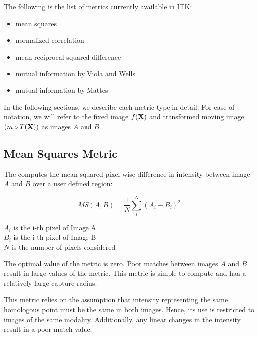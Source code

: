 The following is the list of metrics currently available in ITK:
\begin{itemize}
\item mean squares\\ 
\item normalized correlation \\ 
\item mean reciprocal squared difference \\  
\item mutual information by Viola and Wells \\ 
\item mutual information by Mattes \\ 
\end{itemize}

In the following sections, we describe each metric type in detail. 
For ease of notation, we will refer to the fixed image $f(\bf{X})$ 
and transformed moving image $(m \circ T(\bf{X}))$ as images $A$ and $B$.

\subsection{Mean Squares Metric}
\label{sec:MeanSquaresMetric}

The  computes the mean squared
pixel-wise difference in intensity between image $A$ and $B$ over a user
defined region:

\begin{equation}
MS(A,B) = \frac{1}{N} \sum_i^N \left( A_i - B_i \right)^2
\end{equation}
\begin{center}
$A_i$ is the i-th pixel of Image A\\ 
$B_i$ is the i-th pixel of Image B\\
$N$ is the number of pixels considered
\end{center}

The optimal value of the metric is zero. Poor matches between images $A$ and
$B$ result in large values of the metric. This metric is simple to compute and
haa a relatively large capture radius.

This metric relies on the assumption that intensity representing the same
homologous point must be the same in both images. Hence, its use is restricted
to images of the same modality. Additionally, any linear changes in the
intensity result in a poor match value.

